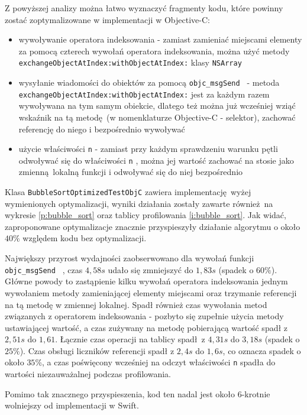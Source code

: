 \documentclass[mgr, shortabstract]{iithesis}
\newcommand{\objcinline}[1]{
    \texttt{#1}
}
\begin{document}
Z powyższej analizy można łatwo wyznaczyć fragmenty kodu, które powinny zostać zoptymalizowane w implementacji w Objective-C:

\begin{itemize}
    \item wywoływanie operatora indeksowania - zamiast zamieniać miejscami elementy za pomocą czterech wywołań operatora indeksowania, można użyć metody \objcinline{exchangeObjectAtIndex:withObjectAtIndex:} klasy \objcinline{NSArray}
    \item wysyłanie wiadomości do obiektów za pomocą \objcinline{objc_msgSend } - metoda \objcinline{exchangeObjectAtIndex:withObjectAtIndex:} jest za każdym razem wywoływana na tym samym obiekcie, dlatego też można już wcześniej wziąć wskaźnik na tą metodę (w nomenklaturze Objective-C - selektor), zachować referencję do niego i bezpośrednio wywoływać
    \item użycie właściwości \objcinline{n} - zamiast przy każdym sprawdzeniu warunku pętli odwoływać się do właściwości \objcinline{n}, można jej wartość zachować na stosie jako zmienną lokalną funkcji i odwoływać się do niej bezpośrednio
\end{itemize}

Klasa \objcinline{BubbleSortOptimizedTestObjC} zawiera implementację wyżej wymienionych optymalizacji, wyniki działania zostały zawarte również na wykresie \ref{p:bubble_sort} oraz tablicy profilowania \ref{i:bubble_sort}. Jak widać, zaproponowane optymalizacje znacznie przyspieszyły działanie algorytmu o około $40\%$ względem kodu bez optymalizacji.

Największy przyrost wydajności zaobserwowano dla wywołań funkcji \objcinline{objc_msgSend }, czas $4,58s$ udało się zmniejszyć do $1,83s$ (spadek o $60\%$). Główne powody to zastąpienie kilku wywołań operatora indeksowania jednym wywołaniem metody zamieniającej elementy miejscami oraz trzymanie referencji na tą metodę w zmiennej lokalnej. Spadł również czas wywołania metod związanych z operatorem indeksowania - pozbyto się zupełnie użycia metody ustawiającej wartość, a czas zużywany na metodę pobierającą wartość spadł z $2,51s$ do $1,61$. Łącznie czas operacji na tablicy spadł z $4,31s$ do $3,18s$ (spadek o $25\%$). Czas obsługi liczników referencji spadł z $2,4s$ do $1,6s$, co oznacza spadek o około $35\%$, a czas poświęcony wcześniej na odczyt właściwości \objcinline{n} spadła do wartości niezauważalnej podczas profilowania.

Pomimo tak znacznego przyspieszenia, kod ten nadal jest około 6-krotnie wolniejszy od implementacji w Swift.
\end{document}
